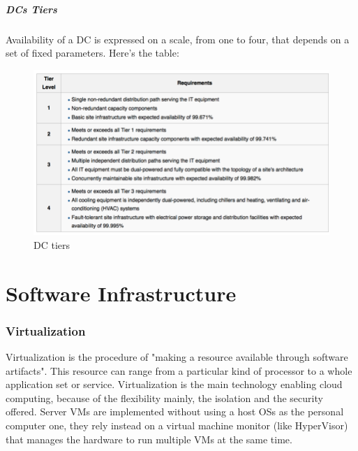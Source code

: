 \documentclass{article}
\begin{document}
				\subsubsection{DCs Tiers}
					Availability of a DC is expressed on a scale, from one to four, that depends on a set of fixed parameters. Here's the table:
					\begin{figure}[H]
						\centering
						\includegraphics[width = \textwidth]{./images/tiers.png}
						\caption{DC tiers}
					\end{figure}

	\clearpage \part{Software Infrastructure}
		\section{Virtualization}
			Virtualization is the procedure of "making a resource available through software artifacts". This resource can range from a particular kind of processor to a whole application set or service. Virtualization is the main technology enabling cloud computing, because of the flexibility mainly, the isolation and the security offered. Server VMs are implemented without using a host OSs as the personal computer one, they rely instead on a virtual machine monitor (like HyperVisor) that manages the hardware to run multiple VMs at the same time.
			
\end{document}
